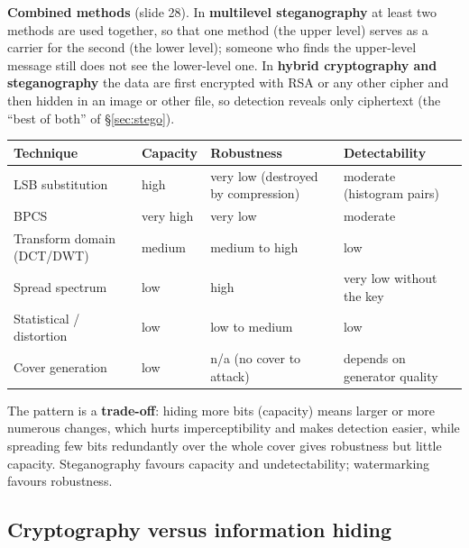 \textbf{Combined methods} (slide 28). In \textbf{multilevel steganography} at least two methods are used together, so that one method (the upper level) serves as a carrier for the second (the lower level); someone who finds the upper-level message still does not see the lower-level one. In \textbf{hybrid cryptography and steganography} the data are first encrypted with RSA or any other cipher and then hidden in an image or other file, so detection reveals only ciphertext (the ``best of both'' of \S\ref{sec:stego}).

\begin{center}\small
\begin{tabular}{@{}llll@{}}
\toprule
Technique & Capacity & Robustness & Detectability\\
\midrule
LSB substitution & high & very low (destroyed by compression) & moderate (histogram pairs)\\
BPCS & very high & very low & moderate\\
Transform domain (DCT/DWT) & medium & medium to high & low\\
Spread spectrum & low & high & very low without the key\\
Statistical / distortion & low & low to medium & low\\
Cover generation & low & n/a (no cover to attack) & depends on generator quality\\
\bottomrule
\end{tabular}
\end{center}
The pattern is a \textbf{trade-off}: hiding more bits (capacity) means larger or more numerous changes, which hurts imperceptibility and makes detection easier, while spreading few bits redundantly over the whole cover gives robustness but little capacity. Steganography favours capacity and undetectability; watermarking favours robustness.

\subsection{Cryptography versus information hiding \hot\new}

